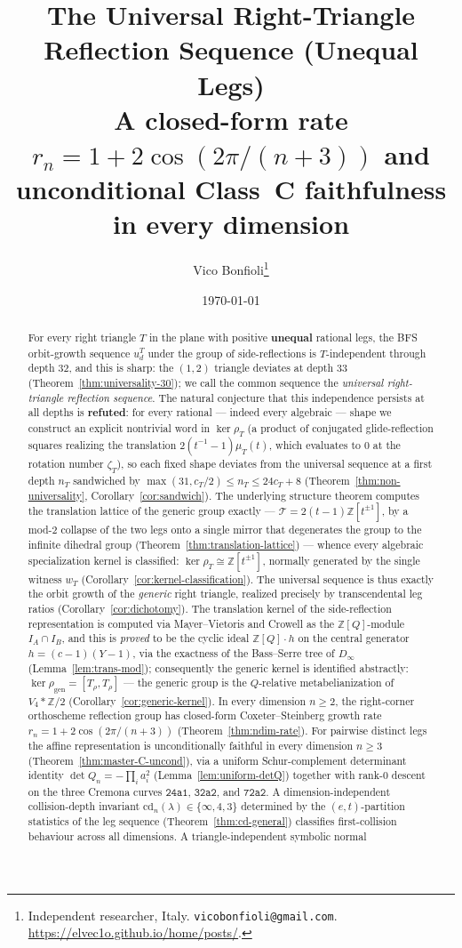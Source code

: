 \documentclass[11pt,a4paper]{article}
\title{\textbf{The Universal Right-Triangle Reflection Sequence (Unequal Legs)}\\[0.3em]
\large A closed-form rate $r_n = 1 + 2\cos(2\pi/(n+3))$ and unconditional Class~C faithfulness in every dimension}
\author{Vico Bonfioli\thanks{Independent researcher, Italy.
\texttt{vicobonfioli@gmail.com}.\,
\url{https://elvec1o.github.io/home/posts/}.}}
\date{\today}
\theoremstyle{remark}
\theoremstyle{plain}
\begin{document}
\maketitle

\begin{abstract}
For every right triangle $T$ in the plane with positive \textbf{unequal} rational legs, the BFS orbit-growth sequence $u_d^T$ under the group of side-reflections is $T$-independent through depth $32$, and this is sharp: the $(1,2)$ triangle deviates at depth $33$ (Theorem~\ref{thm:universality-30}); we call the common sequence the \emph{universal right-triangle reflection sequence}.  The natural conjecture that this independence persists at all depths is \textbf{refuted}: for every rational --- indeed every algebraic --- shape we construct an explicit nontrivial word in $\ker \rho_T$ (a product of conjugated glide-reflection squares realizing the translation $2(t^{-1}-1)\mu_T(t)$, which evaluates to $0$ at the rotation number $\zeta_T$), so each fixed shape deviates from the universal sequence at a first depth $n_T$ sandwiched by $\max(31, c_T/2) \le n_T \le 24c_T + 8$ (Theorem~\ref{thm:non-universality}, Corollary~\ref{cor:sandwich}).  The underlying structure theorem computes the translation lattice of the generic group exactly --- $\mathcal{T} = 2(t-1)\mathbb{Z}[t^{\pm 1}]$, by a mod-$2$ collapse of the two legs onto a single mirror that degenerates the group to the infinite dihedral group (Theorem~\ref{thm:translation-lattice}) --- whence every algebraic specialization kernel is classified: $\ker\rho_T \cong \mathbb{Z}[t^{\pm 1}]$, normally generated by the single witness $w_T$ (Corollary~\ref{cor:kernel-classification}).  The universal sequence is thus exactly the orbit growth of the \emph{generic} right triangle, realized precisely by transcendental leg ratios (Corollary~\ref{cor:dichotomy}).  The translation kernel of the side-reflection representation is computed via Mayer--Vietoris and Crowell as the $\mathbb{Z}[Q]$-module $I_A \cap I_B$, and this is \emph{proved} to be the cyclic ideal $\mathbb{Z}[Q]\cdot h$ on the central generator $h = (c-1)(Y-1)$, via the exactness of the Bass--Serre tree of $D_\infty$ (Lemma~\ref{lem:trans-mod}); consequently the generic kernel is identified abstractly: $\ker\rho_{\mathrm{gen}} = [T_\rho, T_\rho]$ --- the generic group is the $Q$-relative metabelianization of $V_4 * \mathbb{Z}/2$ (Corollary~\ref{cor:generic-kernel}).  In every dimension $n \ge 2$, the right-corner orthoscheme reflection group has closed-form Coxeter--Steinberg growth rate $r_n = 1 + 2\cos(2\pi/(n+3))$ (Theorem~\ref{thm:ndim-rate}).  For pairwise distinct legs the affine representation is unconditionally faithful in every dimension $n \ge 3$ (Theorem~\ref{thm:master-C-uncond}), via a uniform Schur-complement determinant identity $\det Q_n = -\prod_i a_i^2$ (Lemma~\ref{lem:uniform-detQ}) together with rank-$0$ descent on the three Cremona curves $\mathtt{24a1}$, $\mathtt{32a2}$, and $\mathtt{72a2}$.  A dimension-independent collision-depth invariant $\mathrm{cd}_n(\lambda) \in \{\infty, 4, 3\}$ determined by the $(e, t)$-partition statistics of the leg sequence (Theorem~\ref{thm:cd-general}) classifies first-collision behaviour across all dimensions.  A triangle-independent symbolic normal 
\end{abstract}
\end{document}
